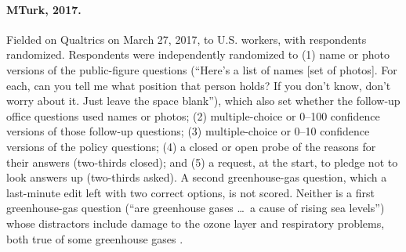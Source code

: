 \documentclass[11pt]{article}
\begin{document}
\paragraph{MTurk, 2017.} Fielded on Qualtrics on March 27, 2017, to U.S. workers, with \nMturk{} respondents randomized. Respondents were independently randomized to (1) name or photo versions of the public-figure questions (``Here's a list of names [set of photos]. For each, can you tell me what position that person holds? If you don't know, don't worry about it. Just leave the space blank''), which also set whether the follow-up office questions used names or photos; (2) multiple-choice or 0--100 confidence versions of those follow-up questions; (3) multiple-choice or 0--10 confidence versions of the policy questions; (4) a closed or open probe of the reasons for their answers (two-thirds closed); and (5) a request, at the start, to pledge not to look answers up (two-thirds asked). A second greenhouse-gas question, which a last-minute edit left with two correct options, is not scored. Neither is a first greenhouse-gas question (``are greenhouse gases \ldots\ a cause of rising sea levels'') whose distractors include damage to the ozone layer and respiratory problems, both true of some greenhouse gases \citep{ravishankara2009}.
\end{document}
